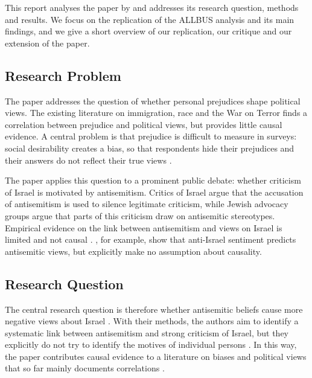 
This report analyses the paper by \citet{binstok2024} and addresses its research question, methods and results. We focus on the replication of the ALLBUS analysis and its main findings, and we give a short overview of our replication, our critique and our extension of the paper.

\subsection{Research Problem}

The paper addresses the question of whether personal prejudices shape political views. The existing literature on immigration, race and the War on Terror finds a correlation between prejudice and political views, but provides little causal evidence. A central problem is that prejudice is difficult to measure in surveys: social desirability creates a bias, so that respondents hide their prejudices and their answers do not reflect their true views \citep[pp.~2329--2331]{binstok2024}.

The paper applies this question to a prominent public debate: whether criticism of Israel is motivated by antisemitism. Critics of Israel argue that the accusation of antisemitism is used to silence legitimate criticism, while Jewish advocacy groups argue that parts of this criticism draw on antisemitic stereotypes.
Empirical evidence on the link between antisemitism and views on Israel is limited and not causal \citep[p.~2334]{binstok2024}. \citet[p.~550]{kaplan2006}, for example, show that anti-Israel sentiment predicts antisemitic views, but explicitly make no assumption about causality.

\subsection{Research Question}

The central research question is therefore whether antisemitic beliefs cause more negative views about Israel \citep[pp.~2331--2332]{binstok2024}. With their methods, the authors aim to identify a systematic link between antisemitism and strong criticism of Israel, but they explicitly do not try to identify the motives of individual persons \citep[p.~2332]{binstok2024}. In this way, the paper contributes causal evidence to a literature on biases and political views that so far mainly documents correlations \citep[pp.~2330--2331]{binstok2024}.

